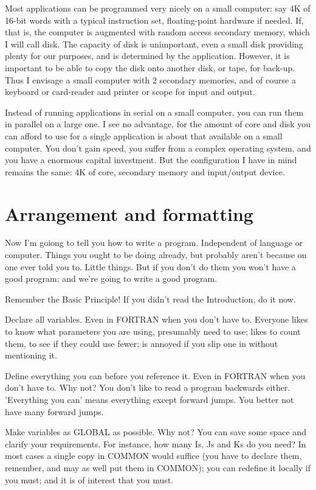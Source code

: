 \documentclass[b5paper, oneside]{book}
\begin{document}
Most applications can be programmed very nicely on a small computer: say 4K of 16-bit words with a typical instruction set, floating-point hardware if needed. If, that is, the computer is augmented with random access secondary memory, which I will call disk. The capacity of disk is unimportant, even a small disk providing plenty for our purposes, and is determined by the application. However, it is important to be able to copy the disk onto another disk, or tape, for back-up. Thus I envisage a small computer with 2 secondary memories, and of course a keyboard or card-reader and printer or scope for input and output.

Instead of running applications in serial on a small computer, you can run them in parallel on a large one. I see no advantage, for the amount of core and disk you can afford to use for a single application is about that available on a small computer. You don't gain speed, you suffer from a complex operating system, and you have a enormous capital investment. But the configuration I have in mind remains the same: 4K of core, secondary memory and input/output device.

\section{Arrangement and formatting}
Now I'm goiong to tell you how to write a program. Independent of language or computer. Things you ought to be doing already, but probably aren't because on one ever told you to. Little things. But if you don't do them you won't have a good program; and we're going to write a good program.

Remember the Basic Principle! If you didn't read the Introduction, do it now.

Declare all variables. Even in FORTRAN when you don't have to. Everyone likes to know what parameters you are using, presumably need to use; likes to count them, to see if they could use fewer; is annoyed if you slip one in without mentioning it.

Define everything you can before you reference it. Even in FORTRAN when you don't have to. Why not? You don't like to read a program backwards either. 'Everything you can' means everything except forward jumps. You better not have many forward jumps.

Make variables as GLOBAL as possible. Why not? You can save some space and clarify your requirements. For instance, how many Is, Js and Ks do you need? In most cases a single copy in COMMON would suffice (you have to declare them, remember, and may as well put them in COMMON); you can redefine it locally if you must; and it is of interest that you must.
\end{document}
